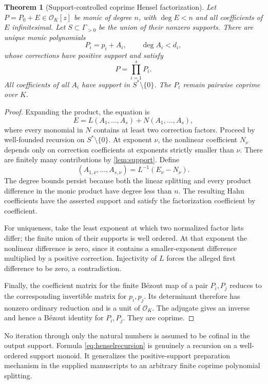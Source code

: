 \documentclass[11pt,letterpaper]{article}
\numberwithin{equation}{section}
\newtheorem{theorem}{Theorem}[section]
\theoremstyle{definition}
\theoremstyle{remark}\newtheorem{remark}[theorem]{Remark}
\newcommand{\OO}{\mathcal O}
\begin{document}
\begin{theorem}[Support-controlled coprime Hensel factorization]
\label{thm:hensel}
Let $P=P_0+E\in\OO_K[z]$ be monic of degree $n$, with $\deg E<n$
and all coefficients of $E$ infinitesimal. Let $S\subset\Gamma_{>0}$
be the union of their nonzero supports. There are unique monic
polynomials
\[
 P_i=p_i+A_i,\qquad \deg A_i<d_i,
\]
whose corrections have positive support and satisfy
\begin{equation}\label{eq:henselfactor}
 P=\prod_{i=1}^sP_i.
\end{equation}
All coefficients of all $A_i$ have support in $S^*\setminus\{0\}$.
The $P_i$ remain pairwise coprime over $K$.
\end{theorem}
\begin{proof}
Expanding the product, the equation is
\[
 E=L(A_1,\ldots,A_s)+N(A_1,\ldots,A_s),
\]
where every monomial in $N$ contains at least two correction factors.
Proceed by well-founded recursion on $S^*\setminus\{0\}$. At exponent
$\nu$, the nonlinear coefficient $N_\nu$ depends only on correction
coefficients at exponents strictly smaller than $\nu$. There are
finitely many contributions by \cref{lem:support}. Define
\begin{equation}\label{eq:henselrecursion}
 (A_{1,\nu},\ldots,A_{s,\nu})=L^{-1}(E_\nu-N_\nu).
\end{equation}
The degree bounds persist because both the linear splitting and every
product difference in the monic product have degree less than $n$.
The resulting Hahn coefficients have the asserted support and satisfy
the factorization coefficient by coefficient.

For uniqueness, take the least exponent at which two normalized factor
lists differ; the finite union of their supports is well ordered.
At that exponent the nonlinear difference is zero, since it contains
a smaller-exponent difference multiplied by a positive correction.
Injectivity of $L$ forces the alleged first difference to be zero,
a contradiction.

Finally, the coefficient matrix for the finite B\'ezout map of a pair
$P_i,P_j$ reduces to the corresponding invertible matrix for $p_i,p_j$.
Its determinant therefore has nonzero ordinary reduction and is a unit
of $\OO_K$. The adjugate gives an inverse and hence a B\'ezout identity
for $P_i,P_j$. They are coprime.
\end{proof}
No iteration through only the natural numbers is assumed to be cofinal
in the output support. Formula \eqref{eq:henselrecursion} is genuinely
a recursion on a well-ordered support monoid. It generalizes the
positive-support preparation mechanism in the supplied manuscripts to
an arbitrary finite coprime polynomial splitting.
\end{document}
